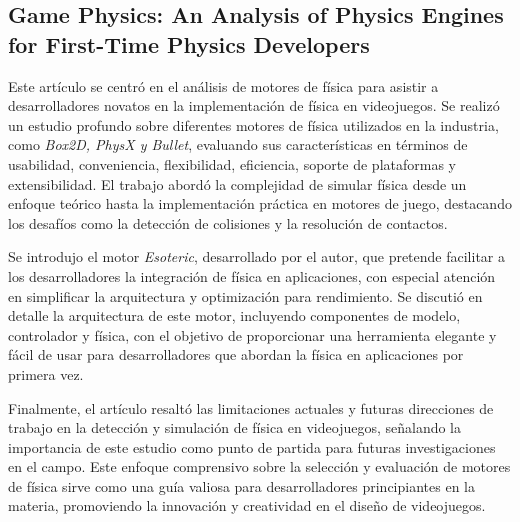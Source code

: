 \subsection{Game Physics: An Analysis of Physics Engines for First-Time Physics Developers}\cite{templet2020}
Este artículo se centró en el análisis de motores de física para asistir a desarrolladores novatos en la implementación de física en videojuegos. Se realizó un estudio profundo sobre diferentes motores de física utilizados en la industria, como \textit{Box2D, PhysX y Bullet}, evaluando sus características en términos de usabilidad, conveniencia, flexibilidad, eficiencia, soporte de plataformas y extensibilidad. El trabajo abordó la complejidad de simular física desde un enfoque teórico hasta la implementación práctica en motores de juego, destacando los desafíos como la detección de colisiones y la resolución de contactos.

Se introdujo el motor \textit{Esoteric}, desarrollado por el autor, que pretende facilitar a los desarrolladores la integración de física en aplicaciones, con especial atención en simplificar la arquitectura y optimización para rendimiento. Se discutió en detalle la arquitectura de este motor, incluyendo componentes de modelo, controlador y física, con el objetivo de proporcionar una herramienta elegante y fácil de usar para desarrolladores que abordan la física en aplicaciones por primera vez.

Finalmente, el artículo resaltó las limitaciones actuales y futuras direcciones de trabajo en la detección y simulación de física en videojuegos, señalando la importancia de este estudio como punto de partida para futuras investigaciones en el campo. Este enfoque comprensivo sobre la selección y evaluación de motores de física sirve como una guía valiosa para desarrolladores principiantes en la materia, promoviendo la innovación y creatividad en el diseño de videojuegos.